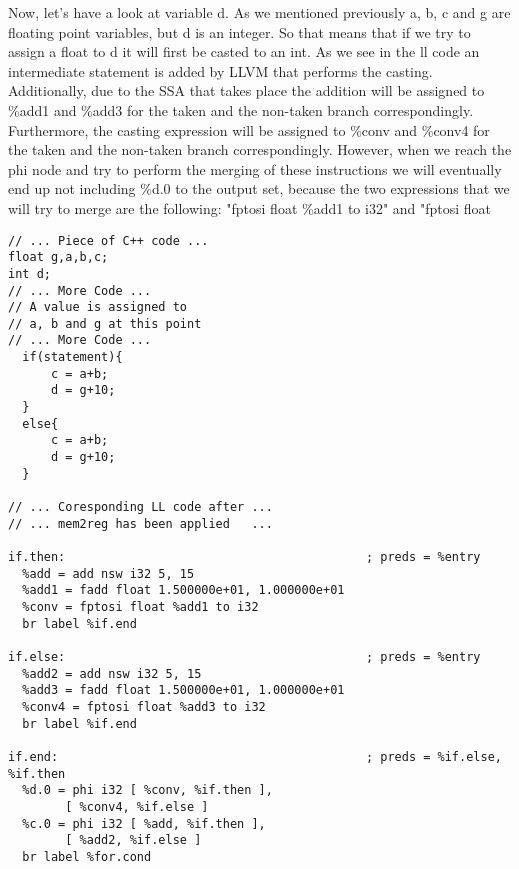 Now, let's have a look at variable d. As we mentioned previously a, b, c and g are floating point variables, but d is an integer. So that means that if we try to assign a float to d it will first be casted to an int. As we see in the ll code an intermediate statement is added by LLVM that performs the casting. Additionally, due to the SSA that takes place the addition will be assigned to \%add1 and \%add3 for the taken and the non-taken branch correspondingly. Furthermore, the casting expression will be assigned to \%conv and \%conv4 for the taken and the non-taken branch correspondingly. However, when we reach the phi node and try to perform the merging of these instructions we will eventually end up not including \%d.0 to the output set, because the two expressions that we will try to merge are the following: "fptosi float \%add1 to i32" and "fptosi float %


\begin{lstlisting}[caption=Merging in Available Expression Analysis preview, label=mAEA]
// ... Piece of C++ code ...
float g,a,b,c;
int d;
// ... More Code ...
// A value is assigned to
// a, b and g at this point
// ... More Code ...
  if(statement){
	  c = a+b;
	  d = g+10;
  }
  else{
	  c = a+b;
	  d = g+10;
  }

// ... Coresponding LL code after ...
// ... mem2reg has been applied   ...

if.then:                                          ; preds = %entry
  %add = add nsw i32 5, 15
  %add1 = fadd float 1.500000e+01, 1.000000e+01
  %conv = fptosi float %add1 to i32
  br label %if.end

if.else:                                          ; preds = %entry
  %add2 = add nsw i32 5, 15
  %add3 = fadd float 1.500000e+01, 1.000000e+01
  %conv4 = fptosi float %add3 to i32
  br label %if.end

if.end:                                           ; preds = %if.else, %if.then
  %d.0 = phi i32 [ %conv, %if.then ], 
        [ %conv4, %if.else ]
  %c.0 = phi i32 [ %add, %if.then ], 
        [ %add2, %if.else ]
  br label %for.cond
  
\end{lstlisting}

